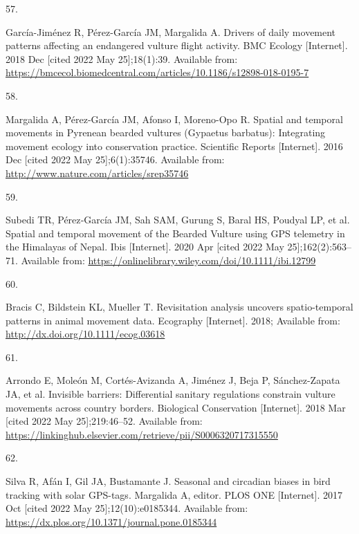 \documentclass[10pt,a4paper]{article}
\newlength{\cslhangindent}
\newlength{\csllabelwidth}
\newlength{\cslentryspacingunit} %
\newenvironment{CSLReferences}[2] %
 {%
  \setlength{\parindent}{0pt}
  \ifodd #1
  \let\oldpar\par
  \def\par{\hangindent=\cslhangindent\oldpar}
  \fi
  \setlength{\parskip}{#2\cslentryspacingunit}
 }%
 {}
\newcommand{\CSLLeftMargin}[1]{\parbox[t]{\csllabelwidth}{#1}}
\newcommand{\CSLRightInline}[1]{\parbox[t]{\linewidth - \csllabelwidth}{#1}\break}
\begin{document}
\begin{CSLReferences}{0}{0}
\leavevmode{}%
\CSLLeftMargin{57. }
\CSLRightInline{García-Jiménez R, Pérez-García JM, Margalida A. Drivers of daily movement patterns affecting an endangered vulture flight activity. BMC Ecology {[}Internet{]}. 2018 Dec {[}cited 2022 May 25{]};18(1):39. Available from: \url{https://bmcecol.biomedcentral.com/articles/10.1186/s12898-018-0195-7}}

\leavevmode{}%
\CSLLeftMargin{58. }
\CSLRightInline{Margalida A, Pérez-García JM, Afonso I, Moreno-Opo R. Spatial and temporal movements in {Pyrenean} bearded vultures ({Gypaetus} barbatus): {Integrating} movement ecology into conservation practice. Scientific Reports {[}Internet{]}. 2016 Dec {[}cited 2022 May 25{]};6(1):35746. Available from: \url{http://www.nature.com/articles/srep35746}}

\leavevmode{}%
\CSLLeftMargin{59. }
\CSLRightInline{Subedi TR, Pérez‐García JM, Sah SAM, Gurung S, Baral HS, Poudyal LP, et al. Spatial and temporal movement of the {Bearded} {Vulture} using {GPS} telemetry in the {Himalayas} of {Nepal}. Ibis {[}Internet{]}. 2020 Apr {[}cited 2022 May 25{]};162(2):563--71. Available from: \url{https://onlinelibrary.wiley.com/doi/10.1111/ibi.12799}}

\leavevmode{}%
\CSLLeftMargin{60. }
\CSLRightInline{Bracis C, Bildstein KL, Mueller T. Revisitation analysis uncovers spatio-temporal patterns in animal movement data. Ecography {[}Internet{]}. 2018; Available from: \url{http://dx.doi.org/10.1111/ecog.03618}}

\leavevmode{}%
\CSLLeftMargin{61. }
\CSLRightInline{Arrondo E, Moleón M, Cortés-Avizanda A, Jiménez J, Beja P, Sánchez-Zapata JA, et al. Invisible barriers: {Differential} sanitary regulations constrain vulture movements across country borders. Biological Conservation {[}Internet{]}. 2018 Mar {[}cited 2022 May 25{]};219:46--52. Available from: \url{https://linkinghub.elsevier.com/retrieve/pii/S0006320717315550}}

\leavevmode{}%
\CSLLeftMargin{62. }
\CSLRightInline{Silva R, Afán I, Gil JA, Bustamante J. Seasonal and circadian biases in bird tracking with solar {GPS}-tags. Margalida A, editor. PLOS ONE {[}Internet{]}. 2017 Oct {[}cited 2022 May 25{]};12(10):e0185344. Available from: \url{https://dx.plos.org/10.1371/journal.pone.0185344}}


\end{CSLReferences}
\end{document}
